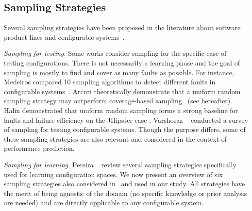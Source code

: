 \subsection{Sampling Strategies} \label{sampling}

Several sampling strategies have been proposed in the literature about software product lines and configurable systems~\cite{thuem2014, julianasurvey, DBLP:conf/splc/VarshosazATRMS18}. 

\emph{Sampling for testing.} Some works consider sampling for the specific case of testing configurations. There is not necessarily a learning phase and the goal of sampling is mostly to find and cover as many faults as possible. For instance, Medeiros \etal compared 10 sampling algorithms to detect different faults in configurable systems~\cite{MKRGA:ICSE16}. Arcuri \etal theoretically demonstrate that a uniform random sampling strategy may outperform coverage-based sampling~\cite{Arcuri2012} (see hereafter).
Halin \etal demonstrated that uniform random sampling forms a strong baseline for faults and failure efficiency on the JHipster case \cite{Halin2018}. Varshosaz \etal~\cite{DBLP:conf/splc/VarshosazATRMS18} conducted a survey of sampling for testing configurable systems. Though the purpose differs, some of these sampling strategies are also relevant and considered in the context of performance prediction. 
 



\emph{Sampling for learning.} Pereira \etal~\cite{julianasurvey} review several sampling strategies specifically used for learning configuration spaces. We now present an overview of six sampling strategies also considered in~\cite{kaltenecker2019} and used in our study. All strategies have the merit of being agnostic of the domain (no specific knowledge or prior analysis are needed) and are directly applicable to any configurable system. \\[-7pt]

